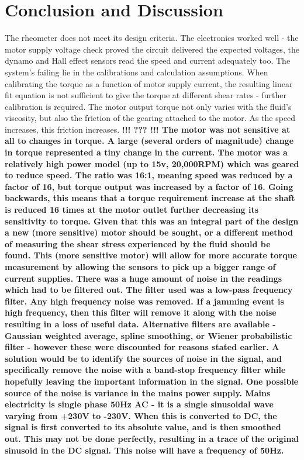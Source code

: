\documentclass[twoside,a4]{report}
\def\shorttitle{Development of a Rheometer Controller}
\def\br{\newline \newline \noindent}
\def\cbh{\large\bfseries !!! ??? !!! \normalsize\normalfont}
\def\achapter{\shorttitle}  %
\def\nc#1{
	\addtocounter{chapter}{1} 
	\def\achapter{\arabic{chapter} #1}
	\chapter*{\arabic{chapter} #1} 
	\addcontentsline{toc}{chapter}{\achapter} 
}
\begin{document}
	\nc{Conclusion and Discussion}
	The rheometer does not meet its design criteria. The electronics worked well - the motor supply voltage check proved the circuit delivered the expected voltages, the dynamo and Hall effect sensors read the speed and current adequately too. The system's failing lie in the calibrations and calculation assumptions. When calibrating the torque as a function of motor supply current, the resulting linear fit equation is not sufficient to give the torque at different shear rates - further calibration is required. The motor output torque not only varies with the fluid's viscosity, but also the friction of the gearing attached to the motor. As the speed increases, this friction increases. \cbh
	\br
	The motor was not sensitive at all to changes in torque. A large (several orders of magnitude) change in torque represented a tiny change in the current. The motor was a relatively high power model (up to 15v, 20,000RPM) which was geared to reduce speed. The ratio was 16:1, meaning speed was reduced by a factor of 16, but torque output was increased by a factor of 16. Going backwards, this means that a torque requirement increase at the shaft is reduced 16 times at the motor outlet further decreasing its sensitivity to torque. Given that this was an integral part of the design a new (more sensitive) motor should be sought, or a different method of measuring the shear stress experienced by the fluid should be found. This (more sensitive motor) will allow for more accurate torque measurement by allowing the sensors to pick up a bigger range of current supplies.
	\br
	There was a huge amount of noise in the readings which had to be filtered out. The filter used was a low-pass frequency filter. Any high frequency noise was removed. If a jamming event is high frequency, then this filter will remove it along with the noise resulting in a loss of useful data. Alternative filters are available - Gaussian weighted average, spline smoothing, or Wiener probabilistic filter - however these were discounted for reasons stated earlier. A solution would be to identify the sources of noise in the signal, and specifically remove the noise with a band-stop frequency filter while hopefully leaving the important information in the signal. 
	\br
	One possible source of the noise is variance in the mains power supply. Mains electricity is single phase 50Hz AC - it is a single sinusoidal wave varying from +230V to -230V. When this is converted to DC, the signal is first converted to its absolute value, and is then smoothed out. This may not be done perfectly, resulting in a trace of the original sinusoid in the DC signal. This noise will have a frequency of 50Hz. 
\end{document}
